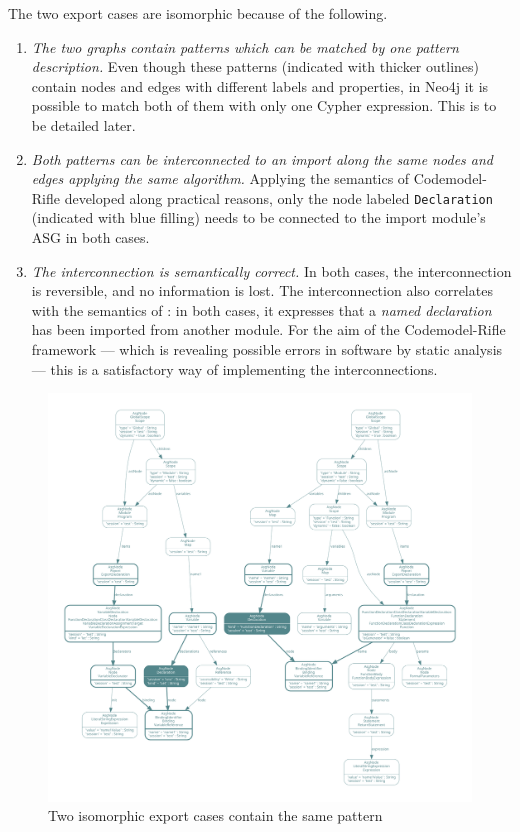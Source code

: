 The two export cases are isomorphic because of the following.
\begin{enumerate}[label=\alph*)]
\item \emph{The two graphs contain patterns which can be matched by one pattern description.} Even though these patterns (indicated with thicker outlines) contain nodes and edges with different labels and properties, in Neo4j it is possible to match both of them with only one Cypher expression. This is to be detailed later.
\item \emph{Both patterns can be interconnected to an import along the same nodes and edges applying the same algorithm.} Applying the semantics of Codemodel-Rifle developed along practical reasons, only the node labeled \lstinline{Declaration} (indicated with blue filling) needs to be connected to the import module's ASG in both cases.
\item \emph{The interconnection is semantically correct.} In both cases, the interconnection is reversible, and no information is lost. The interconnection also correlates with the semantics of \es: in both cases, it expresses that a \emph{named declaration} has been imported from another module. For the aim of the Codemodel-Rifle framework — which is revealing possible errors in software by static analysis — this is a satisfactory way of implementing the interconnections.
\end{enumerate}

\begin{figure}[!htb]
	\centering
	\includegraphics[width=\textwidth, trim=5mm 5mm 5mm 5mm,clip]{figures/export-declaration-demonstration.pdf}
	\caption{Two isomorphic export cases contain the same pattern}
	\label{fig:export-declaration-demonstration}
\end{figure}

